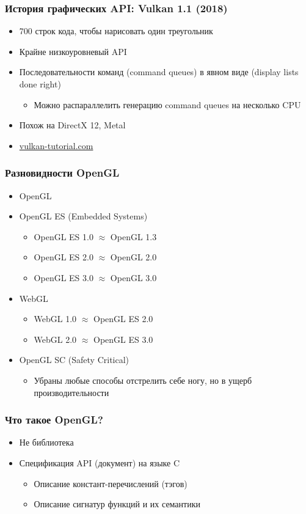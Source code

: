 \documentclass{beamer}
\begin{document}
\begin{frame}
\frametitle{История графических API: Vulkan 1.1 (2018)}
\begin{itemize}
\item 700 строк кода, чтобы нарисовать один треугольник
\pause
\item Крайне низкоуровневый API
\item Последовательности команд (command queues) в явном виде (display lists done right)
\begin{itemize}
\item Можно распараллелить генерацию command queues на несколько CPU
\end{itemize}
\pause
\item Похож на DirectX 12, Metal
\item \url{vulkan-tutorial.com}
\end{itemize}
\end{frame}

\begin{frame}
\frametitle{Разновидности OpenGL}
\begin{itemize}
\item OpenGL
\pause
\item OpenGL ES (Embedded Systems)
\begin{itemize}
\item OpenGL ES 1.0 $\approx$ OpenGL 1.3
\item OpenGL ES 2.0 $\approx$ OpenGL 2.0
\item OpenGL ES 3.0 $\approx$ OpenGL 3.0
\end{itemize}
\pause
\item WebGL
\begin{itemize}
\item WebGL 1.0 $\approx$ OpenGL ES 2.0
\item WebGL 2.0 $\approx$ OpenGL ES 3.0
\end{itemize}
\pause
\item OpenGL SC (Safety Critical)
\begin{itemize}
\item Убраны любые способы отстрелить себе ногу, но в ущерб производительности
\end{itemize}
\end{itemize}
\end{frame}

\begin{frame}
\frametitle{Что такое OpenGL?}
\begin{itemize}
\item {\color{red}Не} библиотека
\item Спецификация API (документ) на языке C
\begin{itemize}
\item Описание констант-перечислений (тэгов)
\item Описание сигнатур функций и их семантики
\end{itemize}
\end{itemize}
\end{frame}
\end{document}
